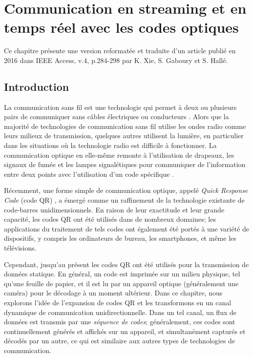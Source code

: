 
\chapter{Communication en streaming et en temps réel avec les codes optiques}

Ce chapitre présente une version reformatée et traduite d'un article publié en 2016 dans IEEE Access, v.4, p.284-298 par K. Xie, S. Gaboury et S. Hallé.

\section{Introduction}\label{sec:qr:intro} %

La communication sans fil est une technologie qui permet à deux ou plusieurs pairs de communiquer sans câbles électriques ou conducteurs \citep{tse2005fundamentals} . Alors que la majorité de technologies de communication sans fil utilise les ondes radio comme leurs milieux de transmission, quelques autres utilisent la lumière, en particulier dans les situations où la technologie radio est difficile à fonctionner. La communication optique en elle-même remonte à l'utilisation de drapeaux, les signaux de fumée et les lampes signalétiques pour communiquer de l'information entre deux points avec l'utilisation d'un code spécifique \citep{burns2004}.

Récemment, une forme simple de communication optique, appelé \emph{Quick Response Code} (code QR) \citep{qrcode-about}, a émergé comme un raffinement de la technologie existante de code-barres unidimensionnels. En raison de leur exactitude et leur grande capacité, les codes QR ont été utilisés dans de nombreux domaines; les applications du traitement de tels codes ont également été portés à une variété de dispositifs, y compris les ordinateurs de bureau, les smartphones, et même les télévisions.

Cependant, jusqu'au présent les codes QR ont été utilisés pour la transmission de données statique. En général, un code est imprimée sur un milieu physique, tel qu'une feuille de papier, et il est lu par un appareil optique (généralement une caméra) pour le décodage à un moment ultérieur. Dans ce chapitre, nous explorons l'idée de l'expansion de codes QR et les transformons en un canal dynamique de communication unidirectionnelle. Dans un tel canal, un flux de données est transmis par une \emph{séquence de codes}; généralement, ces codes sont continuellement générés et affichés sur un appareil, et simultanément capturés et décodés par un autre, ce qui est similaire aux autres types de technologies de communication.

